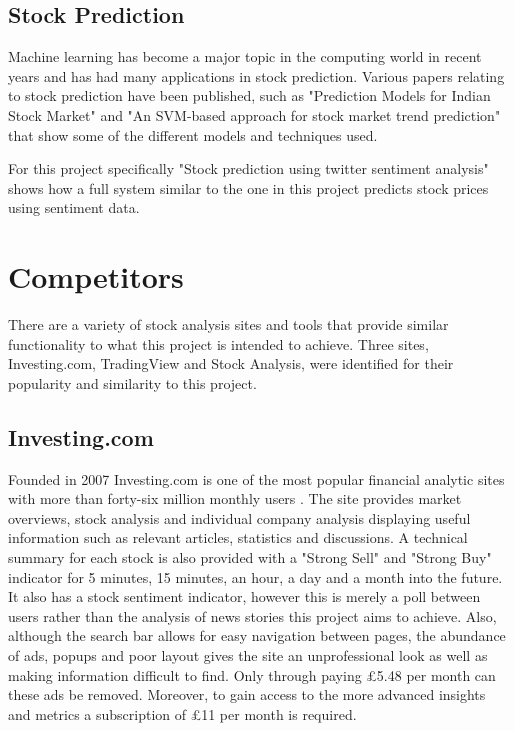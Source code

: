     \subsection{Stock Prediction}
    \label{backgroudn:prediction}
    Machine learning has become a major topic in the computing world in recent years and has had many applications in stock prediction. Various papers relating to stock prediction have been published, such as "Prediction Models for Indian Stock Market" \citep{NAYAK2016441} and "An SVM-based approach for stock market trend prediction" \citep{6706743} that show some of the different models and techniques used. 
    
    For this project specifically "Stock prediction using twitter sentiment analysis" \citep{mittal2012stock} shows how a full system similar to the one in this project predicts stock prices using sentiment data.
    
        
\section{Competitors}
\label{Competitors}
There are a variety of stock analysis sites and tools that provide similar functionality to what this project is intended to achieve. Three sites, Investing.com, TradingView and Stock Analysis, were identified for their popularity and similarity to this project.

    \subsection{Investing.com}
    Founded in 2007 Investing.com is one of the most popular financial analytic sites with more than forty-six million monthly users \citep{website:Investing.com}. The site provides market overviews, stock analysis and individual company analysis displaying useful information such as relevant articles, statistics and discussions. A technical summary for each stock is also provided with a "Strong Sell" and "Strong Buy" indicator for 5 minutes, 15 minutes, an hour, a day and a month into the future. It also has a stock sentiment indicator, however this is merely a poll between users rather than the analysis of news stories this project aims to achieve. Also, although the search bar allows for easy navigation between pages, the abundance of ads, popups and poor layout gives the site an unprofessional look as well as making information difficult to find. Only through paying £5.48 per month can these ads be removed. Moreover, to gain access to the more advanced insights and metrics a subscription of £11 per month is required. 
    
